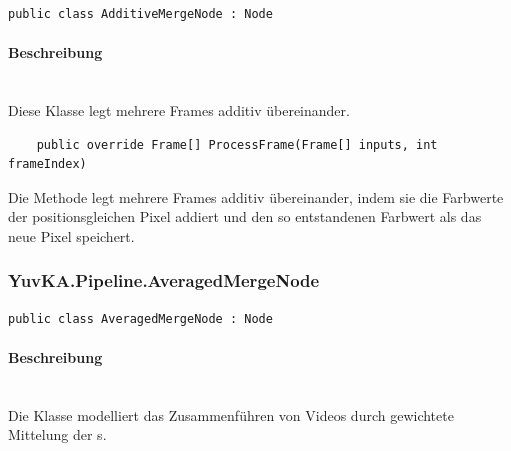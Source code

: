 \begin{verbatim}
public class AdditiveMergeNode : Node
\end{verbatim}

\paragraph{Beschreibung}~\\
Diese Klasse  legt mehrere Frames additiv übereinander.

\begin{itemize}

\begin{verbatim}
	public override Frame[] ProcessFrame(Frame[] inputs, int frameIndex)
\end{verbatim}
Die Methode  legt mehrere Frames additiv übereinander, indem sie die Farbwerte der positionsgleichen Pixel addiert und den so entstandenen Farbwert als das neue Pixel speichert.
\end{itemize}

\subsubsection{YuvKA.Pipeline.AveragedMergeNode}

\begin{verbatim}
public class AveragedMergeNode : Node
\end{verbatim}

\paragraph{Beschreibung}~\\
Die Klasse  modelliert das Zusammenführen von Videos durch gewichtete Mittelung der s.

